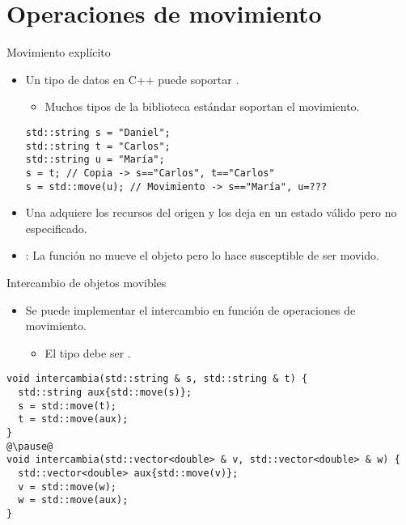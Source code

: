\section{Operaciones de movimiento}

\begin{frame}[t,fragile]{Movimiento explícito}
\begin{itemize}
  \item Un tipo de datos en C++ puede soportar .
    \begin{itemize}
      \item Muchos tipos de la biblioteca estándar soportan el movimiento.
    \end{itemize}
\begin{lstlisting}
std::string s = "Daniel";
std::string t = "Carlos";
std::string u = "María";
s = t; // Copia -> s=="Carlos", t=="Carlos"
s = std::move(u); // Movimiento -> s=="María", u=???
\end{lstlisting}

  \item Una  adquiere los recursos del
        origen y los deja en un estado válido pero no especificado.

  \item {}: La función  no mueve el objeto 
        pero lo hace susceptible de ser movido.

\end{itemize}
\end{frame}

\begin{frame}[t,fragile]{Intercambio de objetos movibles}
\begin{itemize}
  \item Se puede implementar el intercambio en función de operaciones de movimiento.
    \begin{itemize}
      \item El tipo debe ser .
    \end{itemize}
\end{itemize}
\begin{lstlisting}[escapechar=@]
void intercambia(std::string & s, std::string & t) {
  std::string aux{std::move(s)};
  s = std::move(t);
  t = std::move(aux);
}
@\pause@
void intercambia(std::vector<double> & v, std::vector<double> & w) {
  std::vector<double> aux{std::move(v)};
  v = std::move(w);
  w = std::move(aux);
}
\end{lstlisting}
\end{frame}

